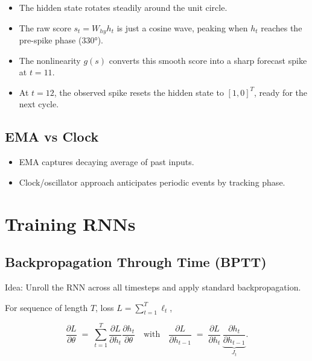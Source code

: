 \documentclass[
]{article}
\providecommand{\tightlist}{%
  \setlength{\itemsep}{0pt}\setlength{\parskip}{0pt}}
\begin{document}
\begin{itemize}
\tightlist
\item
  The hidden state rotates steadily around the unit circle.\\
\item
  The raw score \(s_t=W_{hy}h_t\) is just a cosine wave, peaking when
  \(h_t\) reaches the pre-spike phase (330°).\\
\item
  The nonlinearity \(g(s)\) converts this smooth score into a sharp
  forecast spike at \(t=11\).\\
\item
  At \(t=12\), the observed spike resets the hidden state to
  \([1,0]^T\), ready for the next cycle.
\end{itemize}

\subsection{EMA vs Clock}\label{ema-vs-clock}



\begin{itemize}
\tightlist
\item
  EMA captures decaying average of past inputs.
\item
  Clock/oscillator approach anticipates periodic events by tracking
  phase.
\end{itemize}

\section{Training RNNs}\label{training-rnns}

\subsection{Backpropagation Through Time
(BPTT)}\label{backpropagation-through-time-bptt}

Idea: Unroll the RNN across all timesteps and apply standard
backpropagation.

For sequence of length \(T\), loss \(L=\sum_{t=1}^T \ell_t\),

\[
\frac{\partial L}{\partial \theta} \;=\; \sum_{t=1}^T \frac{\partial L}{\partial h_t}\frac{\partial h_t}{\partial \theta}
\quad\text{with}\quad
\frac{\partial L}{\partial h_{t-1}} \;=\; \frac{\partial L}{\partial h_t}\, \underbrace{\frac{\partial h_t}{\partial h_{t-1}}}_{J_t}.
\]
\end{document}
